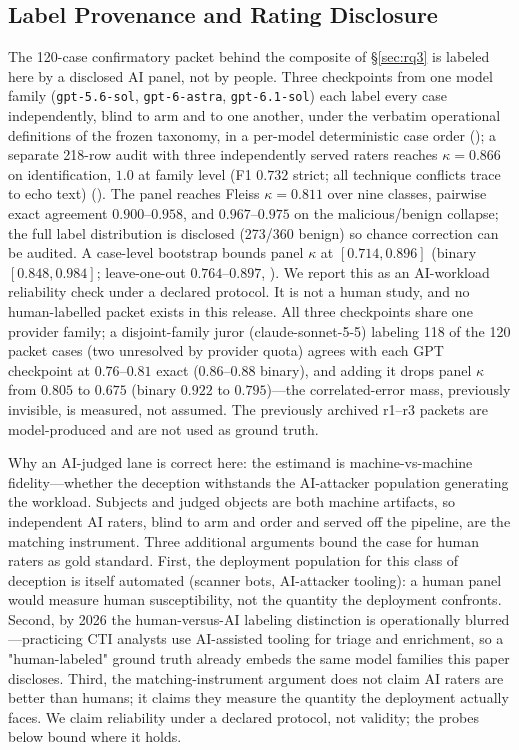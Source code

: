 \subsection{Label Provenance and Rating Disclosure}
\label{sec:labels}
The 120-case confirmatory packet behind the composite of
\S\ref{sec:rq3} is labeled here by a disclosed AI panel, not by people.
Three checkpoints from one model family (\texttt{gpt-5.6-sol},
\texttt{gpt-6-astra}, \texttt{gpt-6.1-sol}) each label every case
independently, blind to arm and to one another, under the verbatim
operational definitions of the frozen taxonomy, in a per-model
deterministic case order
(); a separate 218-row audit with three independently served raters
reaches $\kappa=0.866$ on identification, $1.0$ at family level (F1
$0.732$ strict; all technique conflicts trace to echo text)
(). The panel
reaches Fleiss $\kappa=0.811$ over nine classes, pairwise exact agreement
$0.900$--$0.958$, and $0.967$--$0.975$ on the malicious/benign collapse; the full label
distribution is disclosed (273/360 benign) so chance correction can be
audited. A case-level bootstrap bounds panel $\kappa$ at $[0.714, 0.896]$ (binary $[0.848, 0.984]$; leave-one-out $0.764$--$0.897$, ). We report this as an AI-workload reliability
check under a declared protocol. It is not a human study, and no human-labelled packet exists in this
release. All three checkpoints share one provider family; a disjoint-family juror (claude-sonnet-5-5) labeling 118 of the 120
packet cases (two unresolved by provider quota) agrees with each GPT
checkpoint at $0.76$--$0.81$ exact ($0.86$--$0.88$
binary), and adding it drops panel $\kappa$ from $0.805$ to $0.675$
(binary $0.922$ to $0.795$)---the correlated-error mass, previously
invisible, is measured, not assumed. The previously archived
r1--r3 packets are model-produced and are not used as ground truth.

Why an AI-judged lane is correct here: the estimand is
machine-vs-machine fidelity---whether the deception withstands the
AI-attacker population generating the workload. Subjects and judged
objects are both machine artifacts, so independent AI raters, blind to
arm and order and served off the pipeline, are the matching instrument.
Three additional arguments bound the case for human raters as gold
standard. First, the deployment population for this class of deception
is itself automated (scanner bots, AI-attacker tooling): a human panel
would measure human susceptibility, not the quantity the deployment
confronts. Second, by 2026 the human-versus-AI labeling distinction is
operationally blurred---practicing CTI analysts use AI-assisted tooling
for triage and enrichment, so a "human-labeled" ground truth already
embeds the same model families this paper discloses. Third, the
matching-instrument argument does not claim AI raters are better than
humans; it claims they measure the quantity the deployment actually
faces. We claim reliability under a declared protocol, not validity;
the probes below bound where it holds.

